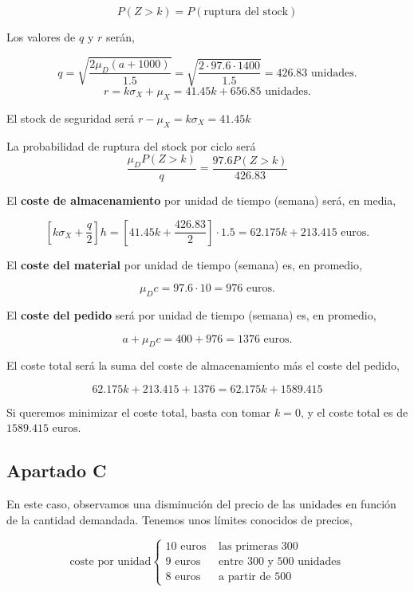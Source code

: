 \documentclass[a4paper,12pt]{article}
\begin{document}
$$ P(Z > k) = P(\text{ruptura del stock})$$

Los valores de $q$ y $r$ ser\'an,

$$ q = \sqrt{\dfrac{2\mu_D(a + 1000)}{1.5}} = \sqrt{\dfrac{2\cdot 97.6\cdot 1400}{1.5}} = 426.83 \text{ unidades.}$$
$$ r = k\sigma_X + \mu_X = 41.45k + 656.85 \text{ unidades.}$$

El stock de seguridad ser\'a $r - \mu_X = k\sigma_X = 41.45k$

La probabilidad de ruptura del stock por ciclo ser\'a $$ \dfrac{\mu_D P(Z > k)}{q} = \dfrac{97.6 P(Z > k)}{426.83}$$

El \textbf{coste de almacenamiento} por unidad de tiempo (semana) ser\'a, en media, 

$$ \left[k\sigma_X + \dfrac{q}{2}\right] h = \left[41.45k + \dfrac{426.83}{2} \right]\cdot 1.5 = 62.175k + 213.415 \text{ euros.}$$

El \textbf{coste del material} por unidad de tiempo (semana) es, en promedio,

$$ \mu_D c = 97.6\cdot 10 = 976 \text{ euros.}$$

El \textbf{coste del pedido} ser\'a por unidad de tiempo (semana) es, en promedio,

$$ a + \mu_D c = 400 + 976 = 1376 \text{ euros.}$$

El coste total ser\'a la suma del coste de almacenamiento m\'as el coste del pedido,

$$ 62.175k + 213.415 + 1376 = 62.175k + 1589.415$$

Si queremos minimizar el coste total, basta con tomar $k = 0 $, y el coste total es de $1589.415 \text{ euros.}$

\pagebreak

\subsection{Apartado C}

En este caso, observamos una disminuci\'on del precio de las unidades en funci\'on de la cantidad demandada. Tenemos unos l\'imites conocidos de precios,
     
	\begin{equation*}
	\text{coste por unidad}  \left\lbrace \begin{array}{ll}	  
		10\text{ euros} & \text{ las primeras 300}\\
		9\text{ euros}  & \text{ entre 300 y 500 unidades}\\
		8\text{ euros}  & \text{ a partir de 500}
	\end{array}
	\right. 
	\end{equation*}
	
\end{document}
